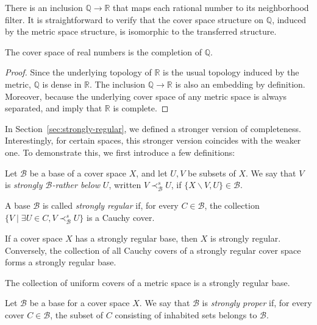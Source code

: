 \documentclass[reqno]{amsart}
\theoremstyle{definition}
\theoremstyle{remark}
\numberwithin{figure}{section}
\newcommand{\rb}{\prec}
\begin{document}
There is an inclusion $\mathbb{Q} \to \mathbb{R}$ that maps each rational number to its neighborhood filter.
It is straightforward to verify that the cover space structure on $\mathbb{Q}$, induced by the metric space structure, is isomorphic to the transferred structure.

\begin{prop}
The cover space of real numbers is the completion of $\mathbb{Q}$.
\end{prop}
\begin{proof}
Since the underlying topology of $\mathbb{R}$ is the usual topology induced by the metric, $\mathbb{Q}$ is dense in $\mathbb{R}$.
The inclusion $\mathbb{Q} \to \mathbb{R}$ is also an embedding by definition.
Moreover, because the underlying cover space of any metric space is always separated,  and  imply that $\mathbb{R}$ is complete.
\end{proof}

In Section~\ref{sec:strongly-regular}, we defined a stronger version of completeness.
Interestingly, for certain spaces, this stronger version coincides with the weaker one.
To demonstrate this, we first introduce a few definitions:

\begin{defn}
Let $\mathcal{B}$ be a base of a cover space $X$, and let $U,V$ be subsets of $X$.
We say that $V$ is \emph{strongly $\mathcal{B}$-rather below} $U$, written $V \rb^s_\mathcal{B} U$, if $\{ X \backslash V, U \} \in \mathcal{B}$.

A base $\mathcal{B}$ is called \emph{strongly regular} if, for every $C \in \mathcal{B}$,
the collection $\{ V \mid \exists U \in C, V \rb^s_\mathcal{B} U \}$ is a Cauchy cover.
\end{defn}

\begin{remark}
If a cover space $X$ has a strongly regular base, then $X$ is strongly regular.
Conversely, the collection of all Cauchy covers of a strongly regular cover space forms a strongly regular base.
\end{remark}

\begin{example}
The collection of uniform covers of a metric space is a strongly regular base.
\end{example}

\begin{defn}
Let $\mathcal{B}$ be a base for a cover space $X$.
We say that $\mathcal{B}$ is \emph{strongly proper} if, for every cover $C \in \mathcal{B}$, the subset of $C$ consisting of inhabited sets belongs to $\mathcal{B}$.
\end{defn}
\end{document}
